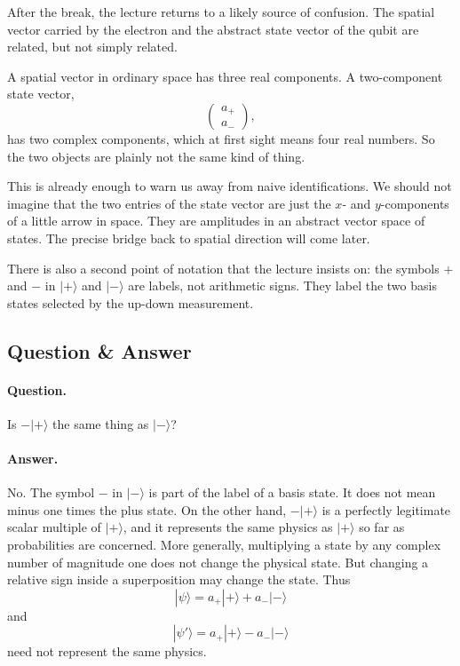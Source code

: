 After the break, the lecture returns to a likely source of confusion. The spatial vector carried by the electron and the abstract state vector of the qubit are related, but not simply related.

A spatial vector in ordinary space has three real components. A two-component state vector,
\[
\begin{pmatrix}a_+\\a_-\end{pmatrix},
\]
has two complex components, which at first sight means four real numbers. So the two objects are plainly not the same kind of thing.

This is already enough to warn us away from naive identifications. We should not imagine that the two entries of the state vector are just the \(x\)- and \(y\)-components of a little arrow in space. They are amplitudes in an abstract vector space of states. The precise bridge back to spatial direction will come later.

There is also a second point of notation that the lecture insists on: the symbols \(+\) and \(-\) in \(|+\rangle\) and \(|-\rangle\) are labels, not arithmetic signs. They label the two basis states selected by the up-down measurement.

\subsection{Question \& Answer}

\paragraph{Question.} Is \(-|+\rangle\) the same thing as \(|-\rangle\)?

\paragraph{Answer.} No. The symbol \(-\) in \(|-\rangle\) is part of the label of a basis state. It does not mean minus one times the plus state. On the other hand, \(-|+\rangle\) is a perfectly legitimate scalar multiple of \(|+\rangle\), and it represents the same physics as \(|+\rangle\) so far as probabilities are concerned. More generally, multiplying a state by any complex number of magnitude one does not change the physical state. But changing a relative sign inside a superposition may change the state. Thus
\[
|\psi\rangle = a_+|+\rangle + a_-|-\rangle
\]
and
\[
|\psi'\rangle = a_+|+\rangle - a_-|-\rangle
\]
need not represent the same physics.

